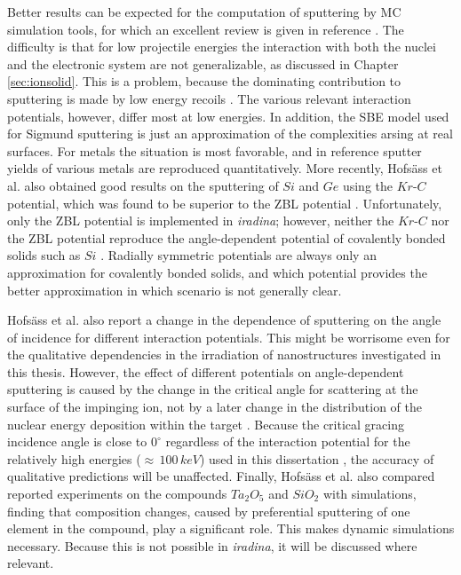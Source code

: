 Better results can be expected for the computation of sputtering by MC simulation tools, for which an excellent review is given in reference \cite{biersack_computer_1987}. The difficulty is that for low projectile energies the interaction with both the nuclei and the electronic system are not generalizable, as discussed in Chapter \ref{sec:ionsolid}. This is a problem, because the dominating contribution to sputtering is made by low energy recoils \cite{thompson_energy_1968}. The various relevant interaction potentials, however, differ most at low energies. In addition, the SBE model used for Sigmund sputtering is just an approximation of the complexities arsing at real surfaces. For metals the situation is most favorable, and in reference \cite{biersack_computer_1987} sputter yields of various metals are reproduced quantitatively. More recently, Hofsäss et al. \cite{hofsass_simulation_2014} also obtained good results on the sputtering of $Si$ and $Ge$ using the $Kr$-$C$ \cite{wilson_calculations_1977} potential, which was found to be superior to the ZBL potential \cite{ziegler_stopping_1985}. Unfortunately, only the ZBL potential is implemented in \emph{iradina}; however, neither the $Kr$-$C$ nor the ZBL potential reproduce the angle-dependent potential of covalently bonded solids such as $Si$ \cite{stillinger_computer_1985,tersoff_new_1988}. Radially symmetric potentials are always only an approximation for covalently bonded solids, and which potential provides the better approximation in which scenario is not generally clear.

Hofsäss et al. \cite{hofsass_simulation_2014} also report a change in the dependence of sputtering on the angle of incidence for different interaction potentials. This might be worrisome even for the qualitative dependencies in the irradiation of nanostructures investigated in this thesis. However, the effect of different potentials on angle-dependent sputtering is caused by the change in the critical angle for scattering at the surface of the impinging ion, not by a later change in the distribution of the nuclear energy deposition within the target \cite{eckstein_influence_1992}. Because the critical gracing incidence angle is close to $0^\circ$ regardless of the interaction potential for the relatively high energies ($\approx\,100\,keV$) used in this dissertation \cite{yamamura_empirical_1984}, the accuracy of qualitative predictions will be unaffected. Finally, Hofsäss et al. \cite{hofsass_simulation_2014} also compared reported experiments on the compounds $Ta_2O_5$ and $SiO_2$ with simulations, finding that composition changes, caused by preferential sputtering of one element in the compound, play a significant role. This makes dynamic simulations necessary. Because this is not possible in \emph{iradina}, it will be discussed where relevant.


